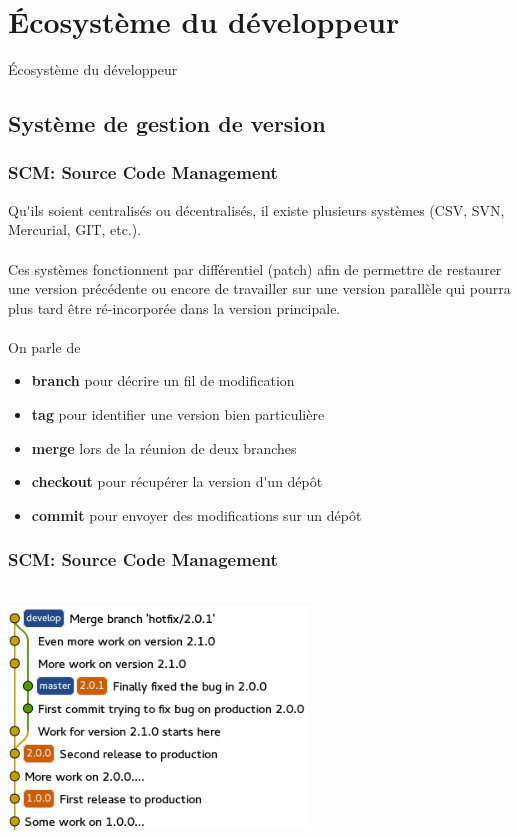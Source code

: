 \section{\'{E}cosyst\`{e}me du d\'{e}veloppeur}

\begin{frame}
    \begin{center}
    \fontsize{48pt}{7.2}\selectfont
    \'{E}cosyst\`{e}me du d\'{e}veloppeur
    \end{center}
\end{frame}

\subsection{Syst\`{e}me de gestion de version}
\begin{frame}
	\frametitle{SCM: Source Code Management}
    Qu\'{}ils soient centralis\'{e}s ou d\'{e}centralis\'{e}s, il existe plusieurs syst\`{e}mes (CSV, SVN, Mercurial, GIT, etc.).
    \\~\\
    Ces syst\`{e}mes fonctionnent par diff\'{e}rentiel (patch) afin de permettre de restaurer une version pr\'{e}c\'{e}dente ou encore de travailler sur une version parall\`{e}le qui pourra plus tard \^{e}tre r\'{e}-incorpor\'{e}e dans la version principale.
    \\~\\
    On parle de
    \begin{itemize}
      \item \textbf{branch} pour d\'{e}crire un fil de modification
      \item \textbf{tag} pour identifier une version bien particuli\`{e}re
      \item \textbf{merge}  lors de la r\'{e}union de deux branches
      \item \textbf{checkout} pour r\'{e}cup\'{e}rer la version d\'{}un d\'{e}p\^{o}t
      \item \textbf{commit} pour envoyer des modifications sur un d\'{e}p\^{o}t
    \end{itemize}
\end{frame}

\begin{frame}
	\frametitle{SCM: Source Code Management}
    ~\\
	\includegraphics[width=8cm]{img/git_sample.png}
    ~\\
\end{frame}

